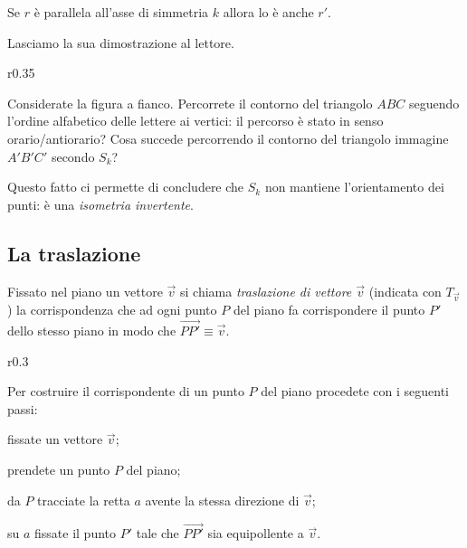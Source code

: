 \begin{teorema}\label{teo:8.5}
Se $r$ è parallela all'asse di simmetria $k$ allora lo è anche $r'$.
\end{teorema}

Lasciamo la sua dimostrazione al lettore.

\setlength{\intextsep}{3pt plus 2.0pt minus 2.0pt}
\begin{wrapfigure}{r}{0.35\textwidth}
  \centering
\end{wrapfigure}
Considerate la figura a fianco. Percorrete il contorno del triangolo 
$ABC$ seguendo l'ordine alfabetico delle lettere ai vertici: il 
percorso è stato in senso orario/antiorario? Cosa succede percorrendo 
il contorno del triangolo immagine $A'B'C'$ secondo $S_k$?

Questo fatto ci permette di concludere che $S_k$ non mantiene 
l'orientamento dei punti: è una \emph{isometria invertente}.

\subsection{La traslazione}

\begin{definizione}
Fissato nel piano un vettore $\vec{v}$ si chiama \emph{traslazione di 
vettore $\vec{v}$} (indicata con $T_{\vec{v}}$) la corrispondenza che 
ad ogni punto $P$ del piano fa corrispondere il punto $P'$ dello 
stesso piano in modo che 
$\overset{\longrightarrow}{PP'}\equiv\vec{v}$.
\end{definizione}

\setlength{\intextsep}{3pt plus 2.0pt minus 2.0pt}
\begin{wrapfigure}{r}{0.3\textwidth}
  \centering
\end{wrapfigure}
Per costruire il corrispondente di un punto $P$ del piano procedete 
con i seguenti passi:
\begin{enumerate*}
\item fissate un vettore $\vec{v}$;
\item prendete un punto $P$ del piano;
\item da $P$ tracciate la retta $a$ avente la stessa direzione di 
$\vec{v}$;
\item su $a$ fissate il punto $P'$ tale che $\overrightarrow{PP'}$ 
sia equipollente a $\vec{v}$.
\end{enumerate*}

